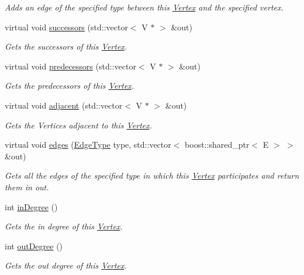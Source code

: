 \begin{DoxyCompactItemize}
\begin{DoxyCompactList}\small\item\em Adds an edge of the specified type between this \hyperlink{classrepast_1_1_vertex}{Vertex} and the specified vertex. \end{DoxyCompactList}\item 
virtual void \hyperlink{classrepast_1_1_directed_vertex_a40dc1f60f518eda0ccbf20622ea82839}{successors} (std\-::vector$<$ V $\ast$ $>$ \&out)
\begin{DoxyCompactList}\small\item\em Gets the successors of this \hyperlink{classrepast_1_1_vertex}{Vertex}. \end{DoxyCompactList}\item 
virtual void \hyperlink{classrepast_1_1_directed_vertex_a2b8af860460fa13b4c5e248e266d2ee2}{predecessors} (std\-::vector$<$ V $\ast$ $>$ \&out)
\begin{DoxyCompactList}\small\item\em Gets the predecessors of this \hyperlink{classrepast_1_1_vertex}{Vertex}. \end{DoxyCompactList}\item 
virtual void \hyperlink{classrepast_1_1_directed_vertex_aded5ff0954773ccc6d0e621950e61659}{adjacent} (std\-::vector$<$ V $\ast$ $>$ \&out)
\begin{DoxyCompactList}\small\item\em Gets the Vertices adjacent to this \hyperlink{classrepast_1_1_vertex}{Vertex}. \end{DoxyCompactList}\item 
virtual void \hyperlink{classrepast_1_1_directed_vertex_abdfdf5f45ddd9026017a2ce62e3c5b7e}{edges} (\hyperlink{classrepast_1_1_vertex_a8b4819d648c7c0dd8b0622beea77cc14}{Edge\-Type} type, std\-::vector$<$ boost\-::shared\-\_\-ptr$<$ E $>$ $>$ \&out)
\begin{DoxyCompactList}\small\item\em Gets all the edges of the specified type in which this \hyperlink{classrepast_1_1_vertex}{Vertex} participates and return them in out. \end{DoxyCompactList}\item 
int \hyperlink{classrepast_1_1_directed_vertex_afd409d365742f1b247734c1283cc059a}{in\-Degree} ()
\begin{DoxyCompactList}\small\item\em Gets the in degree of this \hyperlink{classrepast_1_1_vertex}{Vertex}. \end{DoxyCompactList}\item 
int \hyperlink{classrepast_1_1_directed_vertex_a2debe4c699a8cafd8e7bad11f15deca8}{out\-Degree} ()
\begin{DoxyCompactList}\small\item\em Gets the out degree of this \hyperlink{classrepast_1_1_vertex}{Vertex}. \end{DoxyCompactList}\end{DoxyCompactItemize}
